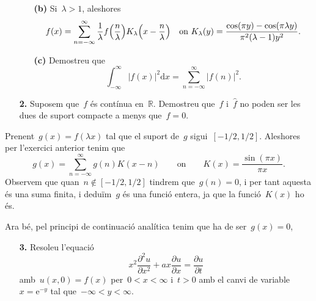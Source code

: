 \documentclass[a4paper]{article}
\theoremstyle{plain}
\theoremstyle{definition}
\newcommand{\e}{\mathrm{e}}
\providecommand{\uppi}{\pi}
\newcommand{\diff}{\mathrm{d}}
\newcommand{\abs}[1]{\lvert{#1}\rvert}
\newcommand{\RR}{\mathbb{R}}
\begin{document}
\begin{enumerate}
    \item[]\begin{enumerate}
        \item[\textbf{(b)}] Si~\(\lambda > 1\), aleshores
            \[
                f(x) =
                \sum_{n=-\infty}^{\infty}
                \frac{1}{\lambda} f\Bigl(\frac{n}{\lambda}\Bigr)
                K_{\lambda}\Bigl(x-\frac{n}{\lambda}\Bigr)
                \quad\text{on}\ %
                K_{\lambda}(y) =
                \frac{\cos(\uppi y) - \cos(\uppi\lambda y)}
                {\uppi^{2}(\lambda-1)y^{2}}.
            \]
    \end{enumerate}
\end{enumerate}


\begin{enumerate}
    \item[]\begin{enumerate}
        \item[\textbf{(c)}] Demostreu que
            \[
                \int_{-\infty}^{\infty}
                \abs{f(x)}^{2}
                \diff x
                =
                \sum_{n=-\infty}^{\infty}
                \abs{f(n)}^{2}.
            \]
    \end{enumerate}
\end{enumerate}

\begin{enumerate}
    \item[\textbf{2.}] Suposem que~\(f\) és contínua en~\(\RR\).
        Demostreu que~\(f\) i~\(\widehat{f}\) no poden ser les dues de suport
        compacte a menys que~\(f=0\).
\end{enumerate}

Prenent~\(g(x)=f(\lambda x)\) tal que el suport de~\(g\) sigui~\([-1/2,1/2]\).
Aleshores per l'exercici anterior tenim que
\[
    g(x)
    =
    \sum_{n=-\infty}^{\infty}
    g(n)
    K(x-n)
    \qquad\text{on}\qquad
    K(x)
    =
    \frac{\sin(\uppi x)}{\uppi x}.
\]
Observem que quan~\(n\notin[-1/2,1/2]\) tindrem que~\(g(n)=0\), i per tant
aquesta és una suma finita, i deduïm~\(g\) és una funció entera, ja que la
funció~\(K(x)\) ho és.

Ara bé, pel principi de continuació analítica tenim que ha de ser~\(g(x)=0\),

\begin{enumerate}
    \item[\textbf{3.}] Resoleu l'equació
        \[
            x^{2}\frac{\partial^{2}u}{\partial x^{2}}
            + ax\frac{\partial u}{\partial x}
            = \frac{\partial u}{\partial t}
        \]
        amb~\(u(x,0) = f(x)\) per~\(0<x<\infty\) i~\(t>0\) amb el canvi de
        variable~\(x=\e^{-y}\) tal que~\(-\infty<y<\infty\).
\end{enumerate}
\end{document}
